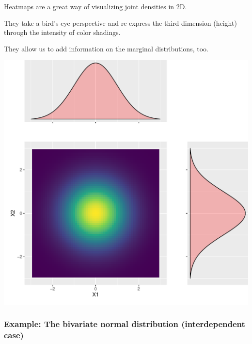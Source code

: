 \documentclass[
  11pt,
]{article}
\begin{document}
Heatmaps are a great way of visualizing joint densities in 2D.

They take a bird's eye perspective and re-express the third dimension (height) through the intensity of color shadings.

They allow us to add information on the marginal distributions, too.

\begin{center}\includegraphics{01-01-lec_files/figure-latex/bvnnorm-2-1} \end{center}

\hypertarget{example-the-bivariate-normal-distribution-interdependent-case}{%
\subsubsection{Example: The bivariate normal distribution (interdependent case)}\label{example-the-bivariate-normal-distribution-interdependent-case}}
\end{document}
